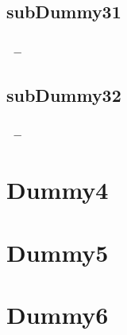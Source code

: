 \documentclass{beamer}
\begin{document}
   \subsection{subDummy31}
   
   \begin{frame}
      \frametitle{\insertsection\ -- \insertsubsection}
      \blindtext
   \end{frame}

   \subsection{subDummy32}
   
   \begin{frame}
      \frametitle{\insertsection\ -- \insertsubsection}
      \blindtext
   \end{frame}
   
   
   \section{Dummy4}
   
   \begin{frame}
      \frametitle{\insertsection}
      \blindtext
   \end{frame}
   
   \section{Dummy5}
   
   \begin{frame}
      \frametitle{\insertsection}
      \blindtext
   \end{frame}
   
   \section{Dummy6}
   
   \begin{frame}
      \frametitle{\insertsection}
      \blindtext
   \end{frame}
 
   
\end{document}
